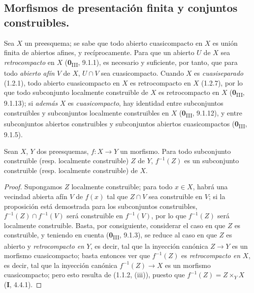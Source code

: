 \subsection{Morfismos de presentación finita y conjuntos construibles.}
\label{subsection:IV.1.8-fr}

\begin{env}[1.8.1]
\label{IV.1.8.1-fr}
Sea $X$ un preesquema; se sabe que todo abierto cuasicompacto en $X$ es
unión finita de abiertos afines, y recíprocamente. Para que un abierto $U$ de
$X$ sea \emph{retrocompacto} en $X$ (\textbf{0}\textsubscript{III}, 9.1.1), es necesario
y suficiente, por tanto, que para todo \emph{abierto afín} $V$ de $X$, $U\cap V$
sea cuasicompacto. Cuando $X$ es \emph{cuasiseparado} (1.2.1), todo abierto
cuasicompacto en $X$ es retrocompacto en $X$ (1.2.7), por lo que todo subconjunto
localmente construible de $X$ es retrocompacto en $X$
(\textbf{0}\textsubscript{III}, 9.1.13); si \emph{además} $X$ es
\emph{cuasicompacto}, hay identidad entre subconjuntos construibles y subconjuntos
localmente construibles en $X$ (\textbf{0}\textsubscript{III}, 9.1.12), y entre
subconjuntos abiertos construibles y subconjuntos abiertos cuasicompactos
(\textbf{0}\textsubscript{III}, 9.1.5).
\end{env}

\begin{proposition}[1.8.2]
\label{IV.1.8.2-fr}
Sean $X$, $Y$ dos preesquemas, $f:X\to Y$ un morfismo. Para todo subconjunto
construible (\textup{resp.} localmente construible) $Z$ de $Y$, $f^{-1}(Z)$ es
un subconjunto construible (\textup{resp.} localmente construible) de $X$.
\end{proposition}

\begin{proof}
Supongamos $Z$ localmente construible; para todo $x\in X$, habrá una
vecindad abierta afín $V$ de $f(x)$ tal que $Z\cap V$ sea construible
en $V$; si la proposición está demostrada para los subconjuntos construibles,
$f^{-1}(Z)\cap f^{-1}(V)$ será construible en $f^{-1}(V)$, por lo que
$f^{-1}(Z)$ será localmente construible. Basta, por consiguiente, considerar
el caso en que $Z$ es construible, y teniendo en cuenta (\textbf{0}\textsubscript{III},
9.1.3), se reduce al caso en que $Z$ es abierto y \emph{retrocompacto en}
$Y$, es decir, tal que la inyección canónica $Z\to Y$ es un morfismo
cuasicompacto; basta entonces ver que $f^{-1}(Z)$ es
\emph{retrocompacto en $X$}, es decir, tal que la inyección canónica
$f^{-1}(Z)\to X$ es un morfismo cuasicompacto; pero esto resulta de
(1.1.2, (iii)), puesto que $f^{-1}(Z)=Z\times_YX$ (\textbf{I}, 4.4.1).
\end{proof}

